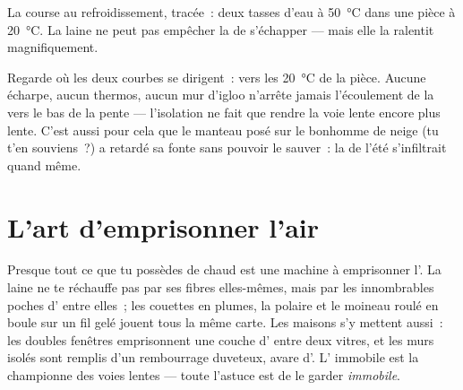 \begin{omfigure}

{\small La course au refroidissement, tracée~: deux tasses d'eau à
\qty{50}{\celsius} dans une pièce à \qty{20}{\celsius}. La laine ne
peut pas empêcher la  de s'échapper --- mais elle la ralentit
magnifiquement.}
\end{omfigure}

\begin{remark}\label{rem:g5:heat-and-insulation:onlyslows}
Regarde où les deux courbes se dirigent~: vers les
\qty{20}{\celsius} de la pièce. Aucune écharpe, aucun thermos, aucun
mur d'igloo n'arrête jamais l'écoulement de la  vers le bas de
la pente --- l'isolation ne fait que rendre la voie lente encore plus
lente. C'est aussi pour cela que le manteau posé sur le bonhomme de
neige (tu t'en souviens~?) a retardé sa fonte sans pouvoir le
sauver~: la  de l'été s'infiltrait quand même.
\end{remark}

\section{L'art d'emprisonner l'air}

\begin{example}\label{ex:g5:heat-and-insulation:air}
Presque tout ce que tu possèdes de chaud est une machine à
emprisonner l'. La laine ne te réchauffe pas par ses fibres
elles-mêmes, mais par les innombrables poches d' entre elles~; les
couettes en plumes, la polaire et le moineau roulé en boule sur un
fil gelé jouent tous la même carte. Les maisons s'y mettent aussi~:
les doubles fenêtres emprisonnent une couche d' entre deux vitres,
et les murs isolés sont remplis d'un rembourrage duveteux, avare
d'. L' immobile est la championne des voies lentes --- toute
l'astuce est de le garder \emph{immobile}.
\end{example}

